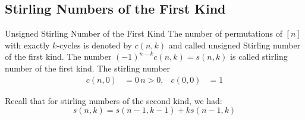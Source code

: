 \documentclass{report}
\begin{document}
\begin{topic}
    \section{Stirling Numbers of the First Kind}
\end{topic}

\begin{definition}{Unsigned Stirling Number of the First Kind}
    The number of permutations of $[n]$ with exactly $k$-cycles is denoted by $c(n, k)$ and called unsigned Stirling number of the first kind. The number $(-1)^{n - k}c(n, k) = s(n, k)$ is called stirling number of the first kind. The stirling number
        \begin{align*}
            c(n, 0) &=0 \, n > 0,  & c(0, 0) &= 1   
        \end{align*}
\end{definition}

Recall that for stirling numbers of the second kind, we had:
    \begin{equation*}
        s(n, k) = s(n - 1, k - 1) + ks(n - 1, k)
    \end{equation*}
\end{document}
